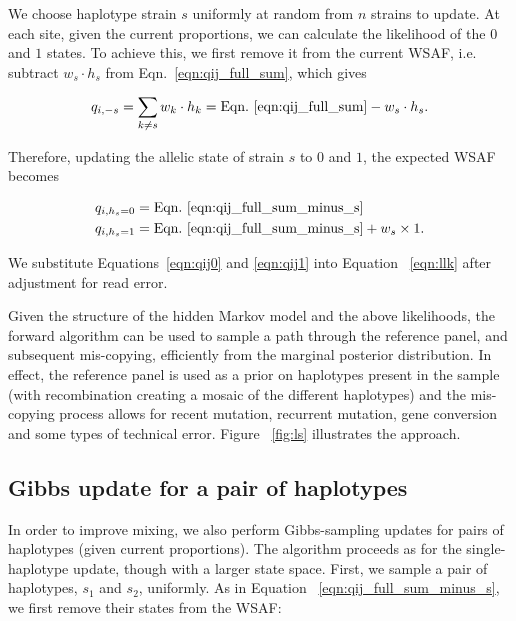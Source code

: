 \documentclass{nature}
\begin{document}
We choose haplotype strain $s$ uniformly at random from $n$ strains to update.  At each site, given the current proportions, we can calculate the likelihood of the $0$ and $1$ states.  To achieve this, we first remove it from the current WSAF, i.e. subtract $ w_s \cdot h_s$ from Eqn.~\eqref{eqn:qij_full_sum}, which gives

\begin{equation}
q_{i,-s} = \sum_{k\neq s} w_k \cdot h_k = \textrm{Eqn.~\eqref{eqn:qij_full_sum}} -  w_s \cdot h_s. \label{eqn:qij_full_sum_minus_s}
\end{equation}

\noindent Therefore, updating the allelic state of strain $s$ to $0$ and $1$, the expected WSAF becomes

\begin{align}
q_{i,h_s=0} & = \textrm{Eqn.~\eqref{eqn:qij_full_sum_minus_s}} \label{eqn:qij0}\\
q_{i,h_s=1} & = \textrm{Eqn.~\eqref{eqn:qij_full_sum_minus_s}} + w_s \times 1. \label{eqn:qij1}
\end{align}

\noindent We substitute Equations~\eqref{eqn:qij0} and \eqref{eqn:qij1} into Equation ~\eqref{eqn:llk} after adjustment for read error.

Given the structure of the hidden Markov model and the above likelihoods, the forward algorithm can be used to sample a path through the reference panel, and subsequent mis-copying, efficiently from the marginal posterior distribution.  In effect, the reference panel is used as a prior on haplotypes present in the sample (with recombination creating a mosaic of the different haplotypes) and the mis-copying process allows for recent mutation, recurrent mutation, gene conversion and some types of technical error.  Figure ~\ref{fig:ls} illustrates the approach.






\subsection*{Gibbs update for a pair of haplotypes}\label{sec:deconvolute}

In order to improve mixing, we also perform Gibbs-sampling updates for pairs of haplotypes (given current proportions). The algorithm proceeds as for the single-haplotype update, though with a larger state space.  First, we sample a pair of haplotypes, $s_1$ and $s_2$, uniformly. As in Equation ~\eqref{eqn:qij_full_sum_minus_s}, we first remove their states from the WSAF:
\end{document}
